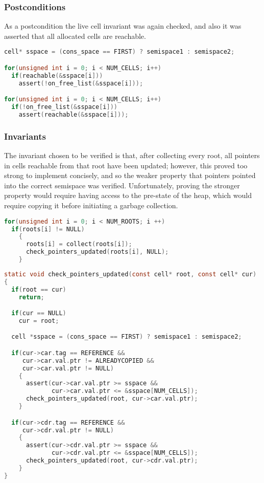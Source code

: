 \subsubsection{Postconditions}
\label{sec:results-impl-c-post}

As a postcondition the live cell invariant was again checked, and also
it was asserted that all allocated cells are reachable.

\begin{lstlisting}[language=C,caption={Fenichel/Yochelson Postconditions}]
cell* sspace = (cons_space == FIRST) ? semispace1 : semispace2;

for(unsigned int i = 0; i < NUM_CELLS; i++)
  if(reachable(&sspace[i]))
    assert(!on_free_list(&sspace[i]));

for(unsigned int i = 0; i < NUM_CELLS; i++)
  if(!on_free_list(&sspace[i]))
    assert(reachable(&sspace[i]));
\end{lstlisting}

\subsubsection{Invariants}
\label{sec:results-impl-c-invariants}

The invariant chosen to be verified is that, after collecting every
root, all pointers in cells reachable from that root have been
updated; however, this proved too strong to implement concisely, and
so the weaker property that pointers pointed into the correct
semispace was verified. Unfortunately, proving the stronger property
would require having access to the pre-state of the heap, which would
require copying it before initiating a garbage collection.

\begin{lstlisting}[language=C,caption={Fenichel/Yochelson GC Loop}]
for(unsigned int i = 0; i < NUM_ROOTS; i ++)
  if(roots[i] != NULL)
    {
      roots[i] = collect(roots[i]);
      check_pointers_updated(roots[i], NULL);
    }
\end{lstlisting}

\begin{lstlisting}[language=C,caption={Fenichel/Yochelson Pointer Checking}]
static void check_pointers_updated(const cell* root, const cell* cur)
{
  if(root == cur)
    return;

  if(cur == NULL)
    cur = root;

  cell *sspace = (cons_space == FIRST) ? semispace1 : semispace2;

  if(cur->car.tag == REFERENCE &&
     cur->car.val.ptr != ALREADYCOPIED &&
     cur->car.val.ptr != NULL)
    {
      assert(cur->car.val.ptr >= sspace &&
             cur->car.val.ptr <= &sspace[NUM_CELLS]);
      check_pointers_updated(root, cur->car.val.ptr);
    }

  if(cur->cdr.tag == REFERENCE &&
     cur->cdr.val.ptr != NULL)
    {
      assert(cur->cdr.val.ptr >= sspace &&
             cur->cdr.val.ptr <= &sspace[NUM_CELLS]);
      check_pointers_updated(root, cur->cdr.val.ptr);
    }
}
\end{lstlisting}

